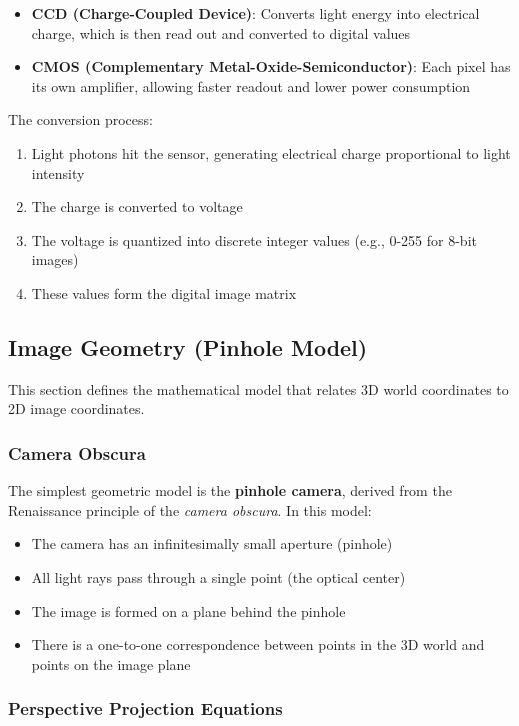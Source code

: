 \documentclass[11pt,a4paper]{article}
\theoremstyle{definition}
\theoremstyle{plain}
\theoremstyle{remark}
\begin{document}
\begin{itemize}
    \item \textbf{CCD (Charge-Coupled Device)}: Converts light energy into electrical charge, which is then read out and converted to digital values
    \item \textbf{CMOS (Complementary Metal-Oxide-Semiconductor)}: Each pixel has its own amplifier, allowing faster readout and lower power consumption
\end{itemize}

The conversion process:
\begin{enumerate}
    \item Light photons hit the sensor, generating electrical charge proportional to light intensity
    \item The charge is converted to voltage
    \item The voltage is quantized into discrete integer values (e.g., 0-255 for 8-bit images)
    \item These values form the digital image matrix
\end{enumerate}

\subsection{Image Geometry (Pinhole Model)}

This section defines the mathematical model that relates 3D world coordinates to 2D image coordinates.

\subsubsection{Camera Obscura}

The simplest geometric model is the \textbf{pinhole camera}, derived from the Renaissance principle of the \textit{camera obscura}. In this model:

\begin{itemize}
    \item The camera has an infinitesimally small aperture (pinhole)
    \item All light rays pass through a single point (the optical center)
    \item The image is formed on a plane behind the pinhole
    \item There is a one-to-one correspondence between points in the 3D world and points on the image plane
\end{itemize}

\subsubsection{Perspective Projection Equations}
\end{document}
